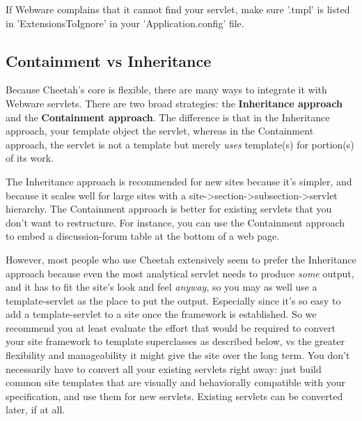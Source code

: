 If Webware complains that it cannot find your servlet, make sure
'.tmpl' is listed in 'ExtensionsToIgnore' in your 'Application.config' file.




\subsection{Containment vs Inheritance}
\label{webware.background}

Because Cheetah's core is flexible, there are many ways to integrate it with
Webware servlets.  There are two broad strategies: the {\bf Inheritance
approach} and the {\bf Containment approach}.  The difference is
that in the Inheritance approach, your template object  the
servlet, whereas in the Containment approach, the servlet is not a template but
merely {\em uses} template(s) for portion(s) of its work.

The Inheritance approach is recommended for new sites because it's simpler, and
because it scales well for large sites with a
site->section->subsection->servlet hierarchy.  The Containment approach is
better for existing servlets that you don't want to restructure.  For instance,
you can use the Containment approach to embed a discussion-forum table at the
bottom of a web page.  

However, most people who use Cheetah extensively seem
to prefer the Inheritance approach because even the most analytical servlet
needs to produce {\em some} output, and it has to fit the site's look and feel
{\em anyway}, so you may as well use a template-servlet as the place to put the
output.  Especially since it's so easy to add a template-servlet to a site once
the framework is established.  So we recommend you at least evaluate the
effort that would be required to convert your site framework to template
superclasses as described below, vs the greater flexibility and manageability
it might give the site over the long term.  You don't necessarily have to
convert all your existing servlets right away: just build common site templates
that are visually and behaviorally compatible with your specification, and use
them for new servlets.  Existing servlets can be converted later, if at all.



